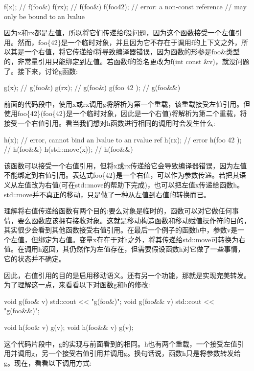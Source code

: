 \begin{cpp}
f(x); // f(foo&)
f(rx); // f(foo&)
f(foo{42}); // error: a non-const reference
            // may only be bound to an lvalue
\end{cpp}

因为x和rx都是左值，所以将它们传递给f没问题，因为这个函数接受一个左值引用。然而，foo\{42\}是一个临时对象，并且因为它不存在于调用f的上下文之外，所以其是一个右值，将它传递给f将导致编译器错误，因为函数的形参是foo\&类型的，非常量引用只能绑定到左值。若函数f的签名更改为f(int const \&v)，就没问题了。接下来，讨论g函数:

\begin{cpp}
g(x); // g(foo&)
g(rx); // g(foo&)
g(foo{ 42 }); // g(foo&&)
\end{cpp}

前面的代码段中，使用x或rx调用g将解析为第一个重载，该重载接受左值引用。但使用foo\{42\}(foo\{42\}是一个临时对象，因此是一个右值)将解析为第二个重载，将接受一个右值引用。看当我们想对h函数进行相同的调用时会发生什么:

\begin{cpp}
h(x); // error, cannot bind an lvalue to an rvalue ref
h(rx); // error
h(foo{ 42 }); // h(foo&&)
h(std::move(x)); // h(foo&&)
\end{cpp}

该函数可以接受一个右值引用，但将x或rx传递给它会导致编译器错误，因为左值不能绑定到右值引用。表达式foo\{42\}是一个右值，可以作为参数传递。若把其语义从左值改为右值(可在std::move的帮助下完成)，也可以把左值x传递给函数h。std::move并不真正的移动，只是做了一种从左值到右值的转换而已。

理解将右值传递给函数有两个目的:要么对象是临时的，函数可以对它做任何事情，要么函数应该拥有接收对象。这就是移动构造函数和移动赋值操作符的目的，其实很少会看到其他函数接受右值引用。在最后一个例子的函数h中，参数v是一个左值，但绑定为右值。变量x存在于对h之外，将其传递给std::move可转换为右值。在调用h返回，其仍然作为左值存在，但需要假设函数h对它做了一些事情，它的状态并不确定。

因此，右值引用的目的是启用移动语义。还有另一个功能，那就是实现完美转发。为了理解这一点，来看看以下对函数g和h的修改:

\begin{cpp}
void g(foo& v) { std::cout << "g(foo&)\n"; }
void g(foo&& v) { std::cout << "g(foo&&)\n"; }

void h(foo& v) { g(v); }
void h(foo&& v) { g(v); }
\end{cpp}

这个代码片段中，g的实现与前面看到的相同。h也有两个重载，一个接受左值引用并调用g，另一个接受右值引用并调用g。换句话说，函数h只是将参数转发给g。现在，看看以下调用方式:

